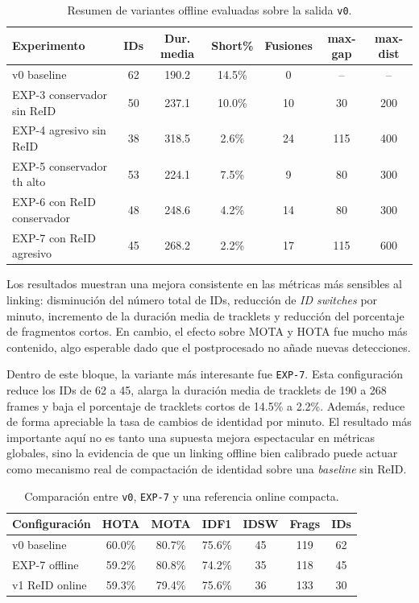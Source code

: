 \documentclass[../MAIN.tex]{subfiles}
\begin{document}
	\begin{table}[H]
		\centering
		\caption{Resumen de variantes offline evaluadas sobre la salida \texttt{v0}.}
		\label{tab:cap10_variantes}
		\small
		\setlength{\tabcolsep}{4pt}
		\begin{tabularx}{\textwidth}{Xcccccc}
			\toprule
			\textbf{Experimento} & \textbf{IDs} & \textbf{Dur. media} & \textbf{Short\%} & \textbf{Fusiones} & \textbf{max-gap} & \textbf{max-dist} \\
			\midrule
			v0 baseline & 62 & 190.2 & 14.5\% & 0 & -- & -- \\
			EXP-3 conservador sin ReID & 50 & 237.1 & 10.0\% & 10 & 30 & 200 \\
			EXP-4 agresivo sin ReID & 38 & 318.5 & 2.6\% & 24 & 115 & 400 \\
			EXP-5 conservador th alto & 53 & 224.1 & 7.5\% & 9 & 80 & 300 \\
			EXP-6 con ReID conservador & 48 & 248.6 & 4.2\% & 14 & 80 & 300 \\
			EXP-7 con ReID agresivo & 45 & 268.2 & 2.2\% & 17 & 115 & 600 \\
			\bottomrule
		\end{tabularx}
	\end{table}
	
	Los resultados muestran una mejora consistente en las métricas más sensibles al linking: disminución del número total de IDs, reducción de \textit{ID switches} por minuto, incremento de la duración media de tracklets y reducción del porcentaje de fragmentos cortos. En cambio, el efecto sobre MOTA y HOTA fue mucho más contenido, algo esperable dado que el postprocesado no añade nuevas detecciones.
	
	Dentro de este bloque, la variante más interesante fue \texttt{EXP-7}. Esta configuración reduce los IDs de 62 a 45, alarga la duración media de tracklets de 190 a 268 frames y baja el porcentaje de tracklets cortos de 14.5\% a 2.2\%. Además, reduce de forma apreciable la tasa de cambios de identidad por minuto. El resultado más importante aquí no es tanto una supuesta mejora espectacular en métricas globales, sino la evidencia de que un linking offline bien calibrado puede actuar como mecanismo real de compactación de identidad sobre una \textit{baseline} sin ReID.
	
	\begin{table}[H]
		\centering
		\caption{Comparación entre \texttt{v0}, \texttt{EXP-7} y una referencia online compacta.}
		\label{tab:cap10_exp7_vs_baselines}
		\begin{tabular}{lcccccc}
			\toprule
			\textbf{Configuración} & \textbf{HOTA} & \textbf{MOTA} & \textbf{IDF1} & \textbf{IDSW} & \textbf{Frags} & \textbf{IDs} \\
			\midrule
			v0 baseline & 60.0\% & 80.7\% & 75.6\% & 45 & 119 & 62 \\
			EXP-7 offline & 59.2\% & 80.8\% & 74.2\% & 35 & 118 & 45 \\
			v1 ReID online & 59.3\% & 79.4\% & 75.6\% & 36 & 133 & 30 \\
			\bottomrule
		\end{tabular}
	\end{table}
	
\end{document}
